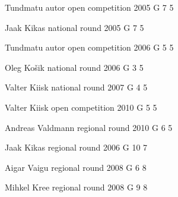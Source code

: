 \documentclass[11pt]{article}
\begin{document}
\ylDisplay{} %
{Tundmatu autor} %
{open competition} %
{2005} %
{G 7} %
{5} %
{

\ifEngStatement
\fi
}

\ylDisplay{} %
{Jaak Kikas} %
{national round} %
{2005} %
{G 7} %
{5} %
{

\ifEngStatement
\fi
}

\ylDisplay{} %
{Tundmatu autor} %
{open competition} %
{2006} %
{G 5} %
{5} %
{

\ifEngStatement
\fi
}

\ylDisplay{} %
{Oleg Košik} %
{national round} %
{2006} %
{G 3} %
{5} %
{

\ifEngStatement
\fi
}

\ylDisplay{} %
{Valter Kiisk} %
{national round} %
{2007} %
{G 4} %
{5} %
{

\ifEngStatement
\fi
}

\ylDisplay{} %
{Valter Kiisk} %
{open competition} %
{2010} %
{G 5} %
{5} %
{

\ifEngStatement
\fi
}

\ylDisplay{} %
{Andreas Valdmann} %
{regional round} %
{2010} %
{G 6} %
{5} %
{

\ifEngStatement
\fi
}

\ylDisplay{} %
{Jaak Kikas} %
{regional round} %
{2006} %
{G 10} %
{7} %
{

\ifEngStatement
\fi
}

\ylDisplay{} %
{Aigar Vaigu} %
{regional round} %
{2008} %
{G 6} %
{8} %
{

\ifEngStatement
\fi
}

\ylDisplay{} %
{Mihkel Kree} %
{regional round} %
{2008} %
{G 9} %
{8} %
{

\ifEngStatement
\fi
}
\end{document}

